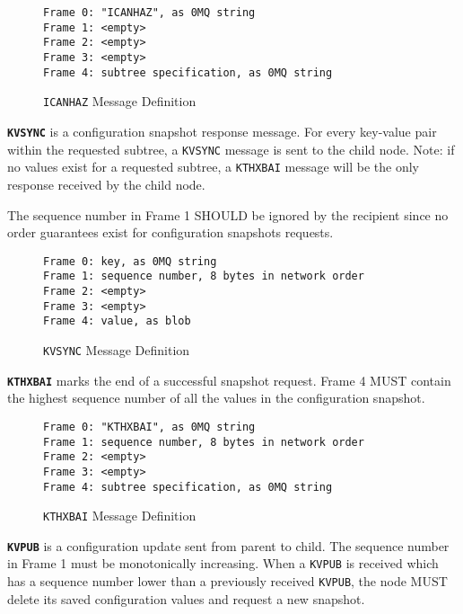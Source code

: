 \begin{figure}[H]
\vspace{+10pt}
\begin{verbatim}
Frame 0: "ICANHAZ", as 0MQ string
Frame 1: <empty>
Frame 2: <empty>
Frame 3: <empty>
Frame 4: subtree specification, as 0MQ string
\end{verbatim}
\vspace{-20pt}
\caption{\texttt{ICANHAZ} Message Definition}
\label{fig:message_icanhaz}
\end{figure}

\textbf{\texttt{KVSYNC}} is a configuration snapshot response message. For every key-value pair within the requested
subtree, a \texttt{KVSYNC} message is sent to the child node. Note: if no values exist for a requested subtree, a
\texttt{KTHXBAI} message will be the only response received by the child node.

The sequence number in Frame 1 SHOULD be ignored by the recipient since no order guarantees exist for configuration
snapshots requests.

\begin{figure}[H]
\vspace{+10pt}
\begin{verbatim}
Frame 0: key, as 0MQ string
Frame 1: sequence number, 8 bytes in network order
Frame 2: <empty>
Frame 3: <empty>
Frame 4: value, as blob
\end{verbatim}
\vspace{-20pt}
\caption{\texttt{KVSYNC} Message Definition}
\label{fig:message_kvsync}
\end{figure}

\textbf{\texttt{KTHXBAI}} marks the end of a successful snapshot request. Frame 4 MUST contain the highest sequence
number of all the values in the configuration snapshot.

\begin{figure}[H]
\vspace{+10pt}
\begin{verbatim}
Frame 0: "KTHXBAI", as 0MQ string
Frame 1: sequence number, 8 bytes in network order
Frame 2: <empty>
Frame 3: <empty>
Frame 4: subtree specification, as 0MQ string
\end{verbatim}
\vspace{-20pt}
\caption{\texttt{KTHXBAI} Message Definition}
\label{fig:message_kthxbai}
\end{figure}

\textbf{\texttt{KVPUB}} is a configuration update sent from parent to child. The sequence number in Frame 1 must be
monotonically increasing. When a \texttt{KVPUB} is received which has a sequence number lower than a previously received
\texttt{KVPUB}, the node MUST delete its saved configuration values and request a new snapshot.


